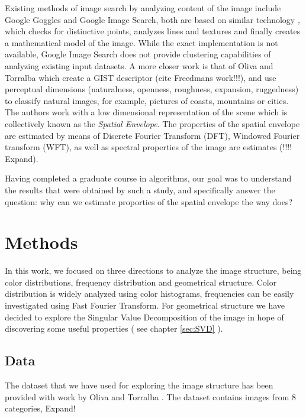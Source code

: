 \documentclass{report}
\begin{document}
Existing methods of image search by analyzing content of the image include Google Goggles and Google Image Search, both are based on similar technology \cite{google_blog}, which checks for distinctive points, analyzes lines and textures and finally creates a mathematical model of the image. While the exact implementation is not available, Google Image Search does not provide clustering capabilities of analyzing existing input datasets. A more closer work is that of Oliva and Torralba \cite{gist_descriptor} which create a GIST descriptor (cite Freedmans work!!!), and use perceptual dimensions (naturalness, openness, roughness, expansion, ruggedness) to classify natural images, for example, pictures of coasts, mountains or cities. The authors work with a low dimensional representation of the scene which is collectively known as the \emph{Spatial Envelope}. The properties of the spatial envelope are estimated by means of Discrete Fourier Transform (DFT), Windowed Fourier transform (WFT), as well as spectral properties of the image are estimates (!!!! Expand). 

Having completed a graduate course in algorithms, our goal was to understand the results that were obtained by such a study, and specifically answer the question: why can we estimate proporties of the spatial envelope the way \cite{gist_descriptor} does? 


\chapter{Methods}
In this work, we focused on three directions to analyze the image structure, being color distributions, frequency distribution and geometrical structure. Color distribution is widely analyzed using color histograms, frequencies can be easily investigated using Fast Fourier Transform. For geometrical structure we have decided to explore the Singular Value Decomposition of the image in hope of discovering some useful properties ( see chapter \ref{sec:SVD} ). 

 

\section{Data}
The dataset that we have used for exploring the image structure has been provided with work by Oliva and Torralba \cite{gist_descriptor}. The dataset contains images from 8 categories, {\color{red} Expand!}
\end{document}
